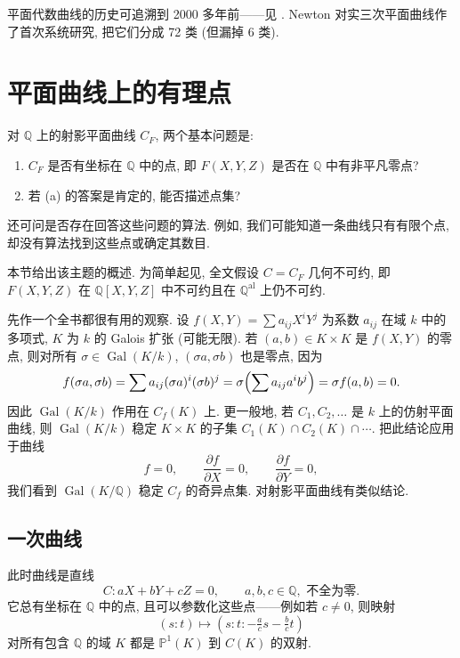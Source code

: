 \begin{remarkstar}
平面代数曲线的历史可追溯到 2000 多年前——见 \cite[第一章]{brieskorn1986}. Newton 对实三次平面曲线作了首次系统研究, 把它们分成 72 类 (但漏掉 6 类).
\end{remarkstar}

\section{平面曲线上的有理点}\label{sec:1.2}

对 $\mathbb{Q}$ 上的射影平面曲线 $C_F$, 两个基本问题是:
\begin{enumerate}[label=\textup{(\alph*)}]
\item $C_F$ 是否有坐标在 $\mathbb{Q}$ 中的点, 即 $F(X,Y,Z)$ 是否在 $\mathbb{Q}$ 中有非平凡零点?
\item 若 (a) 的答案是肯定的, 能否描述点集?
\end{enumerate}
还可问是否存在回答这些问题的算法. 例如, 我们可能知道一条曲线只有有限个点, 却没有算法找到这些点或确定其数目.

本节给出该主题的概述. 为简单起见, 全文假设 $C = C_F$ 几何不可约, 即 $F(X,Y,Z)$ 在 $\mathbb{Q}[X,Y,Z]$ 中不可约且在 $\mathbb{Q}^{\mathrm{al}}$ 上仍不可约.

先作一个全书都很有用的观察. 设 $f(X,Y) = \sum a_{ij}X^iY^j$ 为系数 $a_{ij}$ 在域 $k$ 中的多项式, $K$ 为 $k$ 的 Galois 扩张 (可能无限). 若 $(a,b)\in K\times K$ 是 $f(X,Y)$ 的零点, 则对所有 $\sigma\in\operatorname{Gal}(K/k)$, $(\sigma a,\sigma b)$ 也是零点, 因为
\[
f(\sigma a,\sigma b) = \sum a_{ij}(\sigma a)^i(\sigma b)^j = \sigma\Bigl(\sum a_{ij}a^ib^j\Bigr) = \sigma f(a,b) = 0.
\]
因此 $\operatorname{Gal}(K/k)$ 作用在 $C_f(K)$ 上. 更一般地, 若 $C_1, C_2, \dots$ 是 $k$ 上的仿射平面曲线, 则 $\operatorname{Gal}(K/k)$ 稳定 $K\times K$ 的子集 $C_1(K)\cap C_2(K)\cap\cdots$. 把此结论应用于曲线
\[
f = 0, \qquad \frac{\partial f}{\partial X} = 0, \qquad \frac{\partial f}{\partial Y} = 0,
\]
我们看到 $\operatorname{Gal}(K/\mathbb{Q})$ 稳定 $C_f$ 的奇异点集. 对射影平面曲线有类似结论.

\subsection*{一次曲线}

此时曲线是直线
\[
C\colon aX + bY + cZ = 0, \qquad a,b,c\in\mathbb{Q}, \text{ 不全为零}.
\]
它总有坐标在 $\mathbb{Q}$ 中的点, 且可以参数化这些点——例如若 $c\neq 0$, 则映射
\[
(s:t)\mapsto(s:t:-\tfrac{a}{c}s - \tfrac{b}{c}t)
\]
对所有包含 $\mathbb{Q}$ 的域 $K$ 都是 $\mathbb{P}^1(K)$ 到 $C(K)$ 的双射.


